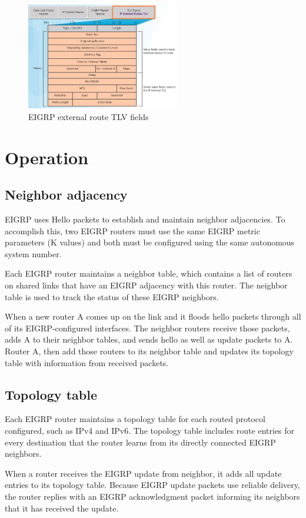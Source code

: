 \begin{figure}[hbtp]
\centering
\includegraphics[width=0.6\textwidth]{pictures/EIGRP-external-route.png}
\caption{EIGRP external route TLV fields} \label{EIGRP-external-route}
\end{figure}
\section{Operation}
\subsection{Neighbor adjacency}
EIGRP uses Hello packets to establish and maintain neighbor adjacencies. To accomplish this, two EIGRP routers must use the same EIGRP metric parameters (K values) and both must be configured using the same autonomous system number.\par 
Each EIGRP router maintains a neighbor table, which contains a list of routers on shared links that have an EIGRP adjacency with this router. The neighbor table is used to track the status of these EIGRP neighbors.\par 
When a new router A comes up on the link and it floods hello packets through all of its EIGRP-configured interfaces. The neighbor routers receive those packets, adds A to their neighbor tables, and sends hello as well as update packets to A. Router A, then add those routers to its neighbor table and updates its topology table with information from received packets.
\subsection{Topology table}
Each EIGRP router maintains a topology table for each routed protocol configured, such as IPv4 and IPv6. The topology table includes route entries for every destination that the router learns from its directly connected EIGRP neighbors.\par 
When a router receives the EIGRP update from neighbor, it adds all update entries to its topology table. Because EIGRP update packets use reliable delivery, the router replies with an EIGRP acknowledgment packet informing its neighbors that it has received the update.

